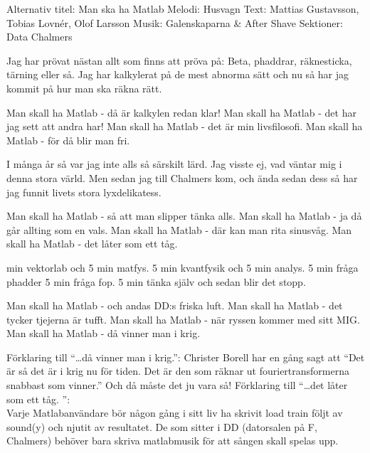 \begin{song}

\begin{songmeta}
Alternativ titel: Man ska ha Matlab
Melodi: Husvagn
Text: Mattias Gustavsson, Tobias Lovnér, Olof Larsson
Musik: Galenskaparna \& After Shave
Sektioner: Data Chalmers
\end{songmeta}

\begin{songtext}
Jag har prövat nästan allt som finns att pröva på:
Beta, phaddrar, räknesticka, tärning eller så.
Jag har kalkylerat på de mest abnorma sätt
och nu så har jag kommit på hur man ska räkna rätt.

Man skall ha Matlab - då är kalkylen redan klar!
Man skall ha Matlab - det har jag sett att andra har!
Man skall ha Matlab - det är min livsfilosofi.
Man skall ha Matlab - för då blir man fri.

I många år så var jag inte alls så särskilt lärd.
Jag visste ej, vad väntar mig i denna stora värld.
Men sedan jag till Chalmers kom, och ända sedan dess
så har jag funnit livets stora lyxdelikatess.

Man skall ha Matlab - så att man slipper tänka alls.
Man skall ha Matlab - ja då går allting som en vals.
Man skall ha Matlab - där kan man rita sinusvåg.
Man skall ha Matlab - det låter som ett tåg.

 min vektorlab och 5 min matfys.
5 min kvantfysik och 5 min analys.
5 min fråga phadder 5 min fråga fop.
5 min tänka själv och sedan blir det stopp.

Man skall ha Matlab - och andas DD:s friska luft.
Man skall ha Matlab - det tycker tjejerna är tufft.
Man skall ha Matlab - när ryssen kommer med sitt MIG.
Man skall ha Matlab - då vinner man i krig.
\end{songtext}

\begin{songnotes}
Förklaring till \textquotedblleft{}\ldots då vinner man i
krig.\textquotedblright{}: Christer Borell har en gång sagt att
\textquotedblleft{}Det är så det är i krig nu för tiden. Det är den som räknar
ut fouriertransformerna snabbast som vinner.\textquotedblright{} Och då måste
det ju vara så!
Förklaring till \textquotedblleft{}\ldots det låter som ett tåg.%
\textquotedblright{}: \\ Varje Matlabanvändare bör någon gång i sitt liv ha
skrivit load train följt av sound(y) och njutit av resultatet.
De som sitter i DD (datorsalen på F, Chalmers) behöver bara skriva matlabmusik
för att sången skall spelas upp.
\end{songnotes}
\end{song}
